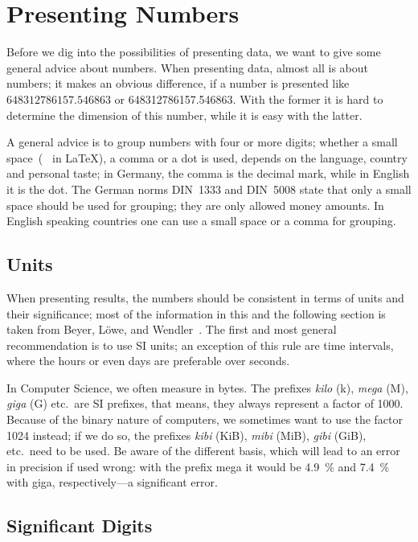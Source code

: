 \section{Presenting Numbers}

Before we dig into the possibilities of presenting data, we want to give some
general advice about numbers.  When presenting data, almost all is about
numbers; it makes an obvious difference, if a number is presented like
$648312786157.546863$ or \num{648312786157.546863}.  With the former it is hard
to determine the dimension of this number, while it is easy with the latter.

A general advice is to group numbers with four or more digits; whether a small
space~(\texttt{\,} in \LaTeX), a comma or a dot is used, depends on
the language, country and personal taste; in Germany, the comma is the decimal
mark, while in English it is the dot.  The German norms DIN~1333 and DIN~5008
state that only a small space should be used for grouping; they are only allowed
money amounts.  In English speaking countries one can use a small space or a
comma for grouping.

\subsection{Units}

When presenting results, the numbers should be consistent in terms of units and
their significance; most of the information in this and the following section is
taken from Beyer, Löwe, and Wendler~\cite{BeyerLoeweWendler2016}.  The first and
most general recommendation is to use SI units; an exception of this rule are
time intervals, where the hours or even days are preferable over seconds.

In Computer Science, we often measure in bytes.  The prefixes \emph{kilo} (k),
\emph{mega} (M), \emph{giga} (G) etc.\ are SI prefixes, that means, they always
represent a factor of \num{1000}.  Because of the binary nature of computers, we
sometimes want to use the factor \num{1024} instead; if we do so, the prefixes
\emph{kibi} (KiB), \emph{mibi} (MiB), \emph{gibi} (GiB), etc.\ need to be used.
Be aware of the different basis, which will lead to an error in precision if
used wrong: with the prefix mega it would be \SI{4.9}{\percent} and
\SI{7.4}{\percent} with giga, respectively—a significant error.

\subsection{Significant Digits}

